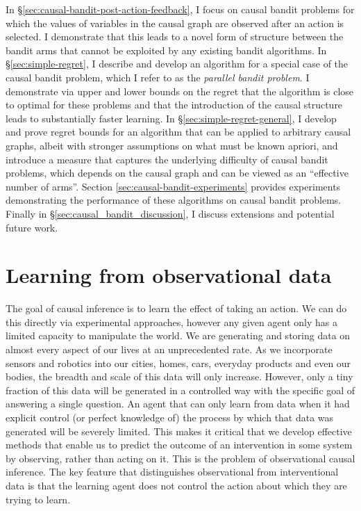\documentclass[11pt,a4paper,twoside]{report}
\newcommand{\quotes}[1]{``#1''}
\theoremstyle{plain}
\theoremstyle{definition}
\begin{document}
In \S\ref{sec:causal-bandit-post-action-feedback}, I focus on causal bandit problems for which the values of variables in the causal graph are observed after an action is selected. I demonstrate that this leads to a novel form of structure between the bandit arms that cannot be exploited by any existing bandit algorithms. In \S\ref{sec:simple-regret}, I describe and develop an algorithm for a special case of the causal bandit problem, which I refer to as the \emph{parallel bandit problem}. I demonstrate via upper and lower bounds on the regret that the algorithm is close to optimal for these problems and that the introduction of the causal structure leads to substantially faster learning. In \S\ref{sec:simple-regret-general}, I develop and prove regret bounds for an algorithm that can be applied to arbitrary causal graphs, albeit with stronger assumptions on what must be known apriori, and introduce a measure that captures the underlying difficulty of causal bandit problems, which depends on the causal graph and can be viewed as an \quotes{effective number of arms}. Section \ref{sec:causal-bandit-experiments} provides experiments demonstrating the performance of these algorithms on causal bandit problems. Finally in \S\ref{sec:causal_bandit_discussion}, I discuss extensions and potential future work. 


\chapter{Learning from observational data}
\label{chap:causality}

The goal of causal inference is to learn the effect of taking an action. We can do this directly via experimental approaches, however any given agent only has a limited capacity to manipulate the world. We are generating and storing data on almost every aspect of our lives at an unprecedented rate. As we incorporate sensors and robotics into our cities, homes, cars, everyday products and even our bodies, the breadth and scale of this data will only increase. However, only a tiny fraction of this data will be generated in a controlled way with the specific goal of answering a single question. An agent that can only learn from data when it had explicit control (or perfect knowledge of) the process by which that data was generated will be severely limited. This makes it critical that we develop effective methods that enable us to predict the outcome of an intervention in some system by observing, rather than acting on it. This is the problem of observational causal inference. The key feature that distinguishes observational from interventional data is that the learning agent does not control the action about which they are trying to learn.
\end{document}
